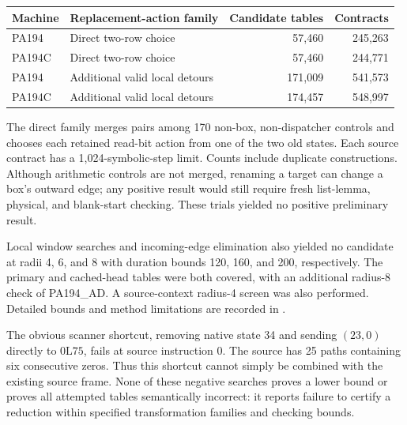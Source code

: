 \begin{center}
\begin{tabular}{@{}llrr@{}}
\toprule
Machine & Replacement-action family & Candidate tables & Contracts\\
\midrule
PA194 & Direct two-row choice &57,460&245,263\\
PA194C & Direct two-row choice &57,460&244,771\\
PA194 & Additional valid local detours &171,009&541,573\\
PA194C & Additional valid local detours &174,457&548,997\\
\bottomrule
\end{tabular}
\end{center}

The direct family merges pairs among 170 non-box, non-dispatcher controls
and chooses each retained read-bit action from one of the two old states.
Each source contract has a 1,024-symbolic-step limit. Counts include
duplicate constructions. Although arithmetic controls are not merged,
renaming a target can change a box's outward edge; any positive result
would still require fresh list-lemma, physical, and blank-start checking.
These trials yielded no positive preliminary result.

Local window searches and incoming-edge elimination also yielded no
candidate at radii 4, 6, and 8 with duration bounds 120, 160, and 200,
respectively. The primary and cached-head tables were both covered, with
an additional radius-8 check of PA194\_AD. A source-context radius-4
screen was also performed. Detailed bounds and method limitations are
recorded in .

The obvious scanner shortcut, removing native state 34 and sending
$(23,0)$ directly to $0\mathrm{L}75$, fails at source instruction 0.
The source has 25 paths containing six consecutive zeros. Thus this
shortcut cannot simply be combined with the existing source frame.
None of these negative searches proves a lower bound or proves all
attempted tables semantically incorrect: it reports failure to certify a
reduction within specified transformation families and checking bounds.
